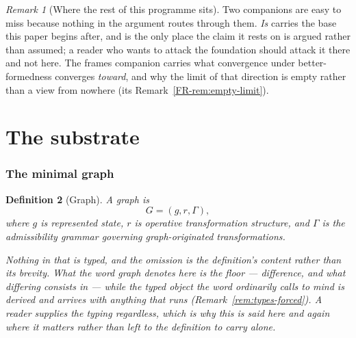 \documentclass[11pt,a4paper]{article}
\newtheorem{definition}{Definition}[section]
\theoremstyle{remark}\newtheorem{remark}[definition]{Remark}
\begin{document}
\begin{remark}[Where the rest of this programme sits]\label{rem:companions}
Two companions are easy to miss because nothing in the argument routes through them. \emph{Is} carries
the base this paper begins after, and is the only place the claim it rests on is argued rather than
assumed; a reader who wants to attack the foundation should attack it there and not here.
The frames companion carries what convergence under better-formedness converges
\emph{toward}, and why the limit of that direction is empty rather than a view from nowhere
(its Remark~\ref{FR-rem:empty-limit}).
\end{remark}

\part{The substrate}
\section{The minimal graph}\label{sec:minimal-graph}
\begin{definition}[Graph]\label{def:graph}
A graph is
\[\boxed{G=(g,r,\Gamma),}\]
where $g$ is represented state, $r$ is operative transformation structure, and $\Gamma$ is the admissibility grammar governing graph-originated transformations.

Nothing in that is typed, and the omission is the definition's content rather than its brevity. What
the word \emph{graph} denotes here is the floor --- difference, and what differing consists in --- while
the typed object the word ordinarily calls to mind is derived and arrives with anything that runs
(Remark~\ref{rem:types-forced}). A reader supplies the typing regardless, which is why this is said here
and again where it matters rather than left to the definition to carry alone.
\end{definition}
\end{document}

